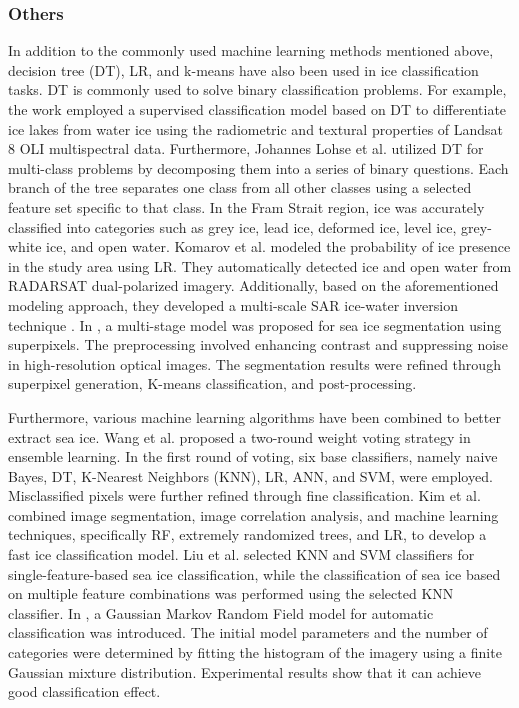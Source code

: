 \subsubsection{Others}
In addition to the commonly used machine learning methods mentioned above, decision tree (DT), LR, and k-means have also been used in ice classification tasks. DT is commonly used to solve binary classification problems. For example, the work \cite{54barbieux2018icy} employed a supervised classification model based on DT to differentiate ice lakes from water ice using the radiometric and textural properties of Landsat 8 OLI multispectral data. Furthermore, Johannes Lohse et al. \cite{55lohse2019optimal} utilized DT for multi-class problems by decomposing them into a series of binary questions. Each branch of the tree separates one class from all other classes using a selected feature set specific to that class. In the Fram Strait region, ice was accurately classified into categories such as grey ice, lead ice, deformed ice, level ice, grey-white ice, and open water. Komarov et al. \cite{56komarov2017automated} modeled the probability of ice presence in the study area using LR. They automatically detected ice and open water from RADARSAT dual-polarized imagery. Additionally, based on the aforementioned modeling approach, they developed a multi-scale SAR ice-water inversion technique \cite{57komarov2020ice}. In \cite{58chen2022superpixel}, a multi-stage model was proposed for sea ice segmentation using superpixels. The preprocessing involved enhancing contrast and suppressing noise in high-resolution optical images. The segmentation results were refined through superpixel generation, K-means classification, and post-processing.


Furthermore, various machine learning algorithms have been combined to better extract sea ice. Wang et al. \cite{38wang2021two} proposed a two-round weight voting strategy in ensemble learning. In the first round of voting, six base classifiers, namely naive Bayes, DT, K-Nearest Neighbors (KNN), LR, ANN, and SVM, were employed. Misclassified pixels were further refined through fine classification. Kim et al. \cite{42kim2020object} combined image segmentation, image correlation analysis, and machine learning techniques, specifically RF, extremely randomized trees, and LR, to develop a fast ice classification model. Liu et al. \cite{69liu2022arctic} selected KNN and SVM classifiers for single-feature-based sea ice classification, while the classification of sea ice based on multiple feature combinations was performed using the selected KNN classifier. In \cite{70ren2021new}, a Gaussian Markov Random Field model for automatic classification was introduced. The initial model parameters and the number of categories were determined by fitting the histogram of the imagery using a finite Gaussian mixture distribution. Experimental results show that it can achieve good classification effect.

